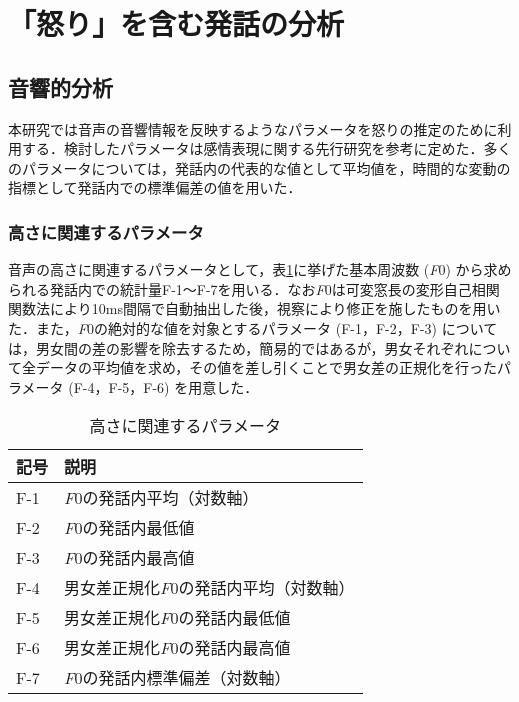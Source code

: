 \documentclass[japanese]{jnlp_1.3c}
\begin{document}
\section{「怒り」を含む発話の分析}
\subsection{音響的分析}
本研究では音声の音響情報を反映するようなパラメータを怒りの推定のために利用する．検討したパラメータは感情表現に関する先行研究\cite[など]{Takeda2002,Cowie2001,Nagae1997,Banse1996,Ang2002}を参考に定めた．多くのパラメータについては，発話内の代表的な値として平均値を，時間的な変動の指標として発話内での標準偏差の値を用いた．

\subsubsection{高さに関連するパラメータ}

音声の高さに関連するパラメータとして，表\ref{tb:F0}に挙げた基本周波数 ({\it F}{\tiny 0}) から求められる発話内での統計量F-1〜F-7を用いる．なお{\it F}{\tiny 0}は可変窓長の変形自己相関関数法により10ms間隔で自動抽出した後，視察により修正を施したものを用いた．また，{\it F}{\tiny 0}の絶対的な値を対象とするパラメータ (F-1，F-2，F-3) については，男女間の差の影響を除去するため，簡易的ではあるが，男女それぞれについて全データの平均値を求め，その値を差し引くことで男女差の正規化を行ったパラメータ (F-4，F-5，F-6) を用意した．

\begin{table}[b] 
\caption{高さに関連するパラメータ}
\label{tb:F0}
\begin{center}
\begin{tabular}{ll}
\hline
記号&説明 \\ \hline
F-1&{\it F}{\tiny 0}の発話内平均（対数軸） \\
F-2&{\it F}{\tiny 0}の発話内最低値 \\
F-3&{\it F}{\tiny 0}の発話内最高値 \\
F-4&男女差正規化{\it F}{\tiny 0}の発話内平均（対数軸） \\
F-5&男女差正規化{\it F}{\tiny 0}の発話内最低値 \\
F-6&男女差正規化{\it F}{\tiny 0}の発話内最高値 \\
F-7&{\it F}{\tiny 0}の発話内標準偏差（対数軸） \\ \hline
\end{tabular}
\end{center}
\end{table}
\end{document}
